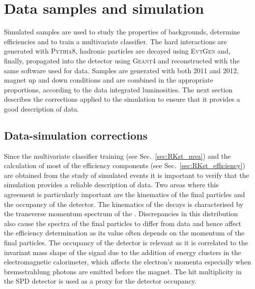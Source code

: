 \section{Data samples and simulation}

Simulated samples are used to study the properties of backgrounds, determine efficiencies and to train
a multivariate classifier. The hard interactions are generated with \textsc{Pythia8}, hadronic particles
are decayed using \textsc{EvtGen} and, finally, propagated into the detector using \textsc{Geant4} and reconstructed
with the same software used for data. Samples are generated with both 2011 and 2012, magnet up and down
conditions and are combined in the appropriate proportions, according to the data integrated luminosities.
The next section describes the corrections applied to the simulation to ensure that it provides a good description of data.


\subsection{Data-simulation corrections}
\label{sec:RKst_mc_weighting}

Since the multivariate classifier training (see Sec.~\ref{sec:RKst_mva}) and the calculation
of most of the efficiency components (see Sec.~\ref{sec:RKst_efficiency}) are obtained from
the study of simulated events it is important to verify that the simulation provides a reliable 
description of data. Two areas where this agreement is particularly important are 
the kinematics of the final particles and the occupancy of the detector.
The kinematics of the decays is characterised by the transverse momentum spectrum of
the \Bz. Discrepancies in this distribution also cause the spectra of the final particles
to differ from data and hence affect the efficiency determination as its value often
depends on the momentum of the final particles.
The occupancy of the detector is relevant as it is correlated to the invariant mass shape of the signal
due to the addition of energy clusters in the electromagnetic calorimeter,
which affects the electron's momenta especially when bremsstrahlung photons are emitted before the magnet.
The hit multiplicity in the SPD detector is used as a proxy for the detector occupancy.

